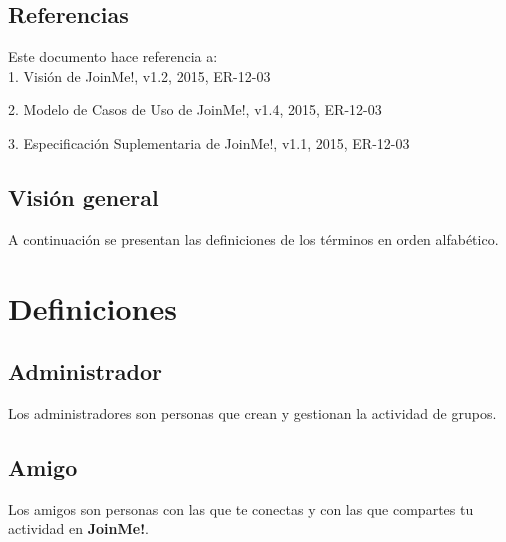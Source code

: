 \documentclass[12pt, a4paper, titlepage]{article}
\begin{document}
\subsection{Referencias}

Este documento hace referencia a:\\

1. Visión de JoinMe!, v1.2, 2015, ER-12-03

2. Modelo de Casos de Uso de JoinMe!, v1.4, 2015, ER-12-03

3. Especificación Suplementaria de JoinMe!, v1.1, 2015, ER-12-03

\subsection{Visión general}

A continuación se presentan las definiciones de los términos en orden alfabético.

\section{Definiciones}

\subsection{Administrador}

Los administradores son personas que crean y gestionan la actividad de grupos.

\subsection{Amigo}

Los amigos son personas con las que te conectas y con las que compartes tu actividad en \textbf{JoinMe!}.

\end{document}

